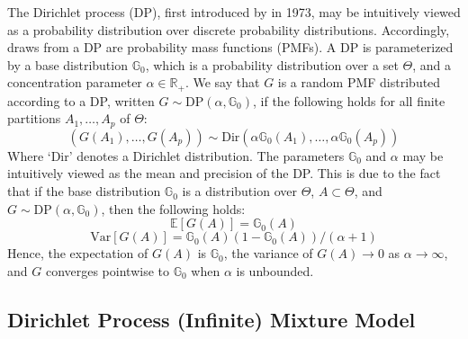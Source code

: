 \documentclass[twocolumn, final]{svjour3}
\begin{document}
The Dirichlet process (DP), first introduced by \cite{ferguson_1973} in 1973, may be intuitively viewed as a probability distribution over discrete probability distributions. Accordingly, draws from a DP are probability mass functions (PMFs). A DP is parameterized by a base distribution $\mathbb{G}_{0}$, which is a probability distribution over a set $\Theta$, and a concentration parameter $\alpha \in \mathbb{R}_{+}$. We say that $G$ is a random PMF distributed according to a DP, written $G \sim \text{DP}(\alpha, \mathbb{G}_{0})$, if the following holds for all finite partitions $A_{1}, \ldots, A_{p}$ of $\Theta$:
\begin{equation}
(G(A_{1}), \ldots, G(A_{p})) \sim \text{Dir}(\alpha \mathbb{G}_{0}(A_{1}), \ldots, \alpha \mathbb{G}_{0}(A_{p}))
\end{equation}
Where `Dir' denotes a Dirichlet distribution. The parameters $\mathbb{G}_{0}$ and $\alpha$ may be intuitively viewed as the mean and precision of the DP. This is due to the fact that if the base distribution $\mathbb{G}_{0}$ is a distribution over $\Theta$, $A \subset \Theta$, and $G \sim \text{DP}(\alpha, \mathbb{G}_{0})$, then the following holds:
\begin{equation}
\mathbb{E}[G(A)] = \mathbb{G}_{0}(A)
\end{equation}
\begin{equation}
\text{Var}[G(A)] = \mathbb{G}_{0}(A) (1 - \mathbb{G}_{0}(A)) / (\alpha + 1)
\end{equation}
Hence, the expectation of $G(A)$ is $\mathbb{G}_{0}$, the variance of $G(A) \rightarrow 0$ as $\alpha \rightarrow \infty$, and $G$ converges pointwise to $\mathbb{G}_{0}$ when $\alpha$ is unbounded.


\subsection{Dirichlet Process (Infinite) Mixture Model}
\label{sec:dpmixture}
\end{document}
